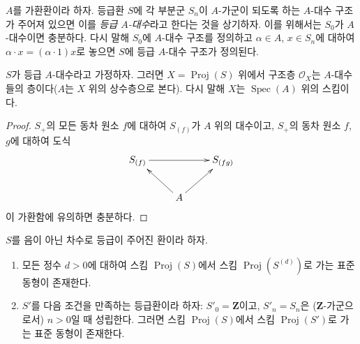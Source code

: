 \begin{env}[2.4.5]
\label{II.2.4.5-ko}
$A$를 가환환이라 하자. 등급환 $S$에 각 부분군 $S_n$이 $A$-가군이
되도록 하는 $A$-대수 구조가 주어져 있으면 이를
\emph{등급 $A$-대수}라고 한다는 것을 상기하자. 이를 위해서는 $S_0$가
$A$-대수이면 충분하다. 다시 말해 $S_0$에 $A$-대수 구조를 정의하고
$\alpha\in A$, $x\in S_n$에 대하여
$\alpha\cdot x=(\alpha\cdot1)x$로 놓으면 $S$에 등급 $A$-대수 구조가
정의된다.
\end{env}

\begin{proposition}[2.4.6]
\label{II.2.4.6-ko}
$S$가 등급 $A$-대수라고 가정하자. 그러면
$X=\operatorname{Proj}(S)$ 위에서 구조층 $\mathcal{O}_X$는
$A$-대수들의 층이다($A$는 $X$ 위의 상수층으로 본다). 다시 말해 $X$는
$\operatorname{Spec}(A)$ 위의 스킴이다.
\end{proposition}

\begin{proof}
$S_+$의 모든 동차 원소 $f$에 대하여 $S_{(f)}$가 $A$ 위의 대수이고,
$S_+$의 동차 원소 $f$, $g$에 대하여 도식
\[
  \xymatrix{
    S_{(f)}\ar[rr] && S_{(fg)}\\
    & A\ar[ul]\ar[ur] &
  }
\]
이 가환함에 유의하면 충분하다.
\end{proof}

\begin{proposition}[2.4.7]
\label{II.2.4.7-ko}
$S$를 음이 아닌 차수로 등급이 주어진 환이라 하자.
\begin{enumerate}
  \item[\rm(i)] 모든 정수 $d>0$에 대하여 스킴
    $\operatorname{Proj}(S)$에서 스킴
    $\operatorname{Proj}(S^{(d)})$로 가는 표준 동형이 존재한다.
  \item[\rm(ii)] $S'$를 다음 조건을 만족하는 등급환이라 하자:
    $S'_0=\mathbf{Z}$이고, $S'_n=S_n$은 ($\mathbf{Z}$-가군으로서)
    $n>0$일 때 성립한다. 그러면 스킴 $\operatorname{Proj}(S)$에서 스킴
    $\operatorname{Proj}(S')$로 가는 표준 동형이 존재한다.
\end{enumerate}
\end{proposition}

